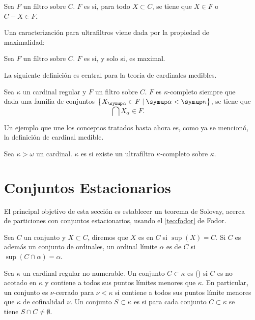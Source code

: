 \begin{defi}
    Sea $F$ un filtro sobre $C$. $F$ es  si, para todo $X\subset C$,
    se tiene que $X\in F$ o $C-X\in F$.
\end{defi}

Una caracterización para ultrafiltros viene dada por la propiedad
de maximalidad:

\begin{teo}
    Sea $F$ un filtro sobre $C$. $F$ es  si, y solo si, es maximal.
\end{teo}

La siguiente definición es central para la teoría de cardinales medibles.

\begin{defi}
    Sea $\kappa$ un cardinal regular y $F$ un filtro sobre $C$.
    $F$ es $\kappa$-completo siempre que dada una familia de conjuntos
    $\set{X_\alpha\in F\mid \alpha<\kappa}$,
    se tiene que
    \[
        \bigcap X_\alpha \in F.
    \]
\end{defi}

Un ejemplo que une los conceptos tratados hasta ahora es, como ya se mencionó,
la definición de cardinal medible.

\begin{defi}
    Sea $\kappa > \omega$ un cardinal. $\kappa$ es  si existe
    un ultrafiltro $\kappa\text{-completo}$ sobre $\kappa$.
\end{defi}

\section{Conjuntos Estacionarios}

El principal objetivo de esta sección es establecer un teorema
de Solovay, acerca de particiones
con conjuntos estacionarios, usando el \cref{teo:fodor}
de Fodor.

Sea $C$ un conjunto y $X\subset C$, diremos que $X$ es 
en $C$ si $\sup(X) = C$.
Si $C$ es además un conjunto de ordinales, un ordinal límite $\alpha$ es
 de $C$ si $\sup ( C \cap\alpha ) = \alpha$.
\begin{defi}
    Sea $\kappa$ un cardinal regular no numerable. Un conjunto $C\subset \kappa$
    es  (\cna) si $C$ es no acotado en $\kappa$ y contiene a
    todos sus puntos límites menores que $\kappa$. En particular, un conjunto es $\nu$-cerrado
    para $\nu<\kappa$ si contiene a todos sus puntos límite menores que $\kappa$ de cofinalidad $\nu$.
    Un conjunto $S\subset\kappa$ es  si para cada conjunto
    \cna{} $C\subset\kappa$ se tiene $S\cap C\neq\emptyset$.
\end{defi}

